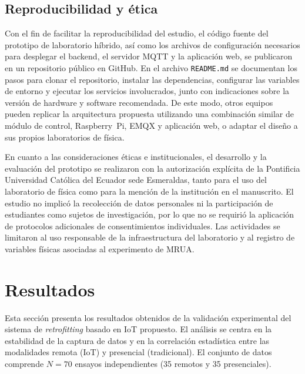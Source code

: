 \documentclass[journal,article,submit,pdftex]{Definitions/mdpi}
\begin{document}
\subsection{Reproducibilidad y \'etica}

Con el fin de facilitar la reproducibilidad del estudio, el c\'odigo fuente del prototipo de laboratorio h\'ibrido, as\'i como los archivos de configuraci\'on necesarios para desplegar el backend, el servidor MQTT y la aplicaci\'on web, se publicaron en un repositorio p\'ublico en GitHub\cite{r15}. En el archivo \texttt{README.md} se documentan los pasos para clonar el repositorio, instalar las dependencias, configurar las variables de entorno y ejecutar los servicios involucrados, junto con indicaciones sobre la versi\'on de hardware y software recomendada. De este modo, otros equipos pueden replicar la arquitectura propuesta utilizando una combinaci\'on similar de módulo de control, Raspberry~Pi, EMQX y aplicaci\'on web, o adaptar el dise\~no a sus propios laboratorios de f\'isica.

En cuanto a las consideraciones éticas e institucionales, el desarrollo y la evaluaci\'on del prototipo se realizaron con la autorizaci\'on expl\'icita de la Pontificia Universidad Cat\'olica del Ecuador sede Esmeraldas, tanto para el uso del laboratorio de f\'isica como para la menci\'on de la instituci\'on en el manuscrito. El estudio no implic\'o la recolecci\'on de datos personales ni la participaci\'on de estudiantes como sujetos de investigaci\'on, por lo que no se requiri\'o la aplicaci\'on de protocolos adicionales de consentimientos individuales. Las actividades se limitaron al uso responsable de la infraestructura del laboratorio y al registro de variables f\'isicas asociadas al experimento de MRUA.


\section{Resultados}

Esta sección presenta los resultados obtenidos de la validación experimental del sistema de \textit{retrofitting} basado en IoT propuesto. El análisis se centra en la estabilidad de la captura de datos y en la correlación estadística entre las modalidades remota (IoT) y presencial (tradicional). El conjunto de datos comprende \(N=70\) ensayos independientes (35 remotos y 35 presenciales).
\end{document}
